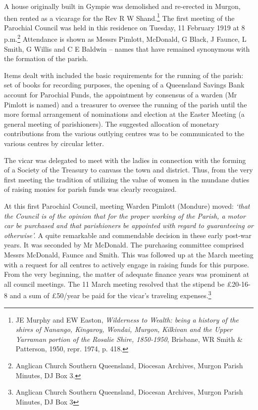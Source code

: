 A house originally built in Gympie was demolished and re-erected in Murgon, then rented as a vicarage for the Rev R W Shand.\footnote{JE Murphy and EW Easton, \emph{Wilderness to Wealth: being a history of the shires of Nanango, Kingaroy, Wondai, Murgon, Kilkivan and the Upper Yarraman portion of the Rosalie Shire, 1850-1950}, Brisbane, WR Smith \& Patterson, 1950, repr. 1974, p. 418.} The first meeting of the Parochial Council was held in this residence on Tuesday, 11 February 1919 at 8 p.m.\footnote{Anglican Church Southern Queensland, Diocesan Archives, Murgon Parish Minutes, DJ Box 3.} Attendance is shown as Messrs Pimlott, McDonald, G Black, J Faunce, L Smith, G Willis and C E Baldwin -- names that have remained synonymous with the formation of the parish.

Items dealt with included the basic requirements for the running of the parish: set of books for recording purposes, the opening of a Queensland Savings Bank account for Parochial Funds, the appointment by consensus of a warden (Mr Pimlott is named) and a treasurer to oversee the running of the parish until the more formal arrangement of nominations and election at the Easter Meeting (a general meeting of parishioners). The suggested allocation of monetary contributions from the various outlying centres was to be communicated to the various centres by circular letter.

The vicar was delegated to meet with the ladies in connection with the forming of a Society of the Treasury to canvass the town and district. Thus, from the very first meeting the tradition of utilizing the value of women in the mundane duties of raising monies for parish funds was clearly recognized.

At this first Parochial Council, meeting Warden Pimlott (Mondure) moved: \emph{`that the Council is of the opinion that for the proper working of the Parish, a motor car be purchased and that parishioners be appointed with regard to guaranteeing or otherwise'.} A quite remarkable and commendable decision in these early post-war years. It was seconded by Mr McDonald. The purchasing committee comprised Messrs McDonald, Faunce and Smith. This was followed up at the March meeting with a request for all centres to actively engage in raising funds for this purpose. From the very beginning, the matter of adequate finance years was prominent at all council meetings. The 11 March meeting resolved that the stipend be £20-16-8 and a sum of £50/year be paid for the vicar's traveling expenses.\footnote{Anglican Church Southern Queensland, Diocesan Archives, Murgon Parish Minutes, DJ Box 3}

